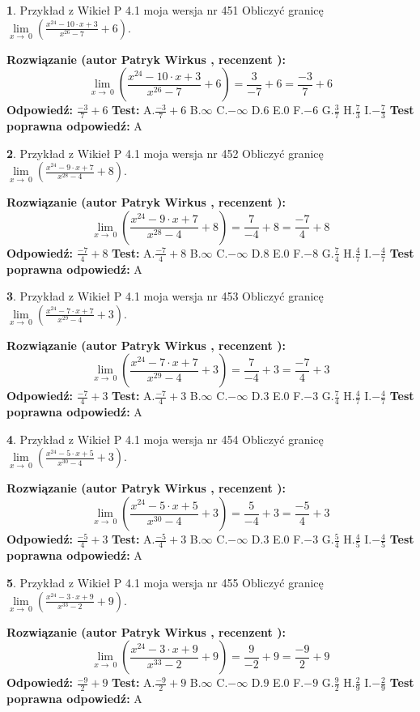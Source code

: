 \documentclass[12pt, a4paper]{article}
\theoremstyle{definition} %
\newtheorem{zad}{}
\newcommand{\zadStart}[1]{\begin{zad}#1\newline}
\newcommand{\zadStop}{\end{zad}}
\newcommand{\rozwStart}[2]{\noindent \textbf{Rozwiązanie (autor #1 , recenzent #2): }\newline}
\newcommand{\rozwStop}{\newline}
\newcommand{\odpStart}{\noindent \textbf{Odpowiedź:}\newline}
\newcommand{\odpStop}{\newline}
\newcommand{\testStart}{\noindent \textbf{Test:}\newline}
\newcommand{\testStop}{\newline}
\newcommand{\kluczStart}{\noindent \textbf{Test poprawna odpowiedź:}\newline}
\newcommand{\kluczStop}{\newline}
\begin{document}
\zadStart{Przykład z Wikieł P 4.1 moja wersja nr 451}
Obliczyć granicę $\lim\limits_{x\to\ 0}(\frac{x^{24}-10 \cdot x +3}{x^{26}-7}+6)$.
\zadStop
\rozwStart{Patryk Wirkus}{}
$$\lim\limits_{x\to\ 0}(\frac{x^{24}-10 \cdot x +3}{x^{26}-7}+6)=\frac{3}{-7}+6=\frac{-3}{7}+6$$
\rozwStop
\odpStart
$\frac{-3}{7}+6$
\odpStop
\testStart
A.$\frac{-3}{7}+6$
B.$\infty$
C.$-\infty$
D.$6$
E.$0$
F.$-6$
G.$\frac{3}{7}$
H.$\frac{7}{3}$
I.$-\frac{7}{3}$
\testStop
\kluczStart
A
\kluczStop



\zadStart{Przykład z Wikieł P 4.1 moja wersja nr 452}
Obliczyć granicę $\lim\limits_{x\to\ 0}(\frac{x^{24}-9 \cdot x +7}{x^{28}-4}+8)$.
\zadStop
\rozwStart{Patryk Wirkus}{}
$$\lim\limits_{x\to\ 0}(\frac{x^{24}-9 \cdot x +7}{x^{28}-4}+8)=\frac{7}{-4}+8=\frac{-7}{4}+8$$
\rozwStop
\odpStart
$\frac{-7}{4}+8$
\odpStop
\testStart
A.$\frac{-7}{4}+8$
B.$\infty$
C.$-\infty$
D.$8$
E.$0$
F.$-8$
G.$\frac{7}{4}$
H.$\frac{4}{7}$
I.$-\frac{4}{7}$
\testStop
\kluczStart
A
\kluczStop



\zadStart{Przykład z Wikieł P 4.1 moja wersja nr 453}
Obliczyć granicę $\lim\limits_{x\to\ 0}(\frac{x^{24}-7 \cdot x +7}{x^{29}-4}+3)$.
\zadStop
\rozwStart{Patryk Wirkus}{}
$$\lim\limits_{x\to\ 0}(\frac{x^{24}-7 \cdot x +7}{x^{29}-4}+3)=\frac{7}{-4}+3=\frac{-7}{4}+3$$
\rozwStop
\odpStart
$\frac{-7}{4}+3$
\odpStop
\testStart
A.$\frac{-7}{4}+3$
B.$\infty$
C.$-\infty$
D.$3$
E.$0$
F.$-3$
G.$\frac{7}{4}$
H.$\frac{4}{7}$
I.$-\frac{4}{7}$
\testStop
\kluczStart
A
\kluczStop



\zadStart{Przykład z Wikieł P 4.1 moja wersja nr 454}
Obliczyć granicę $\lim\limits_{x\to\ 0}(\frac{x^{24}-5 \cdot x +5}{x^{30}-4}+3)$.
\zadStop
\rozwStart{Patryk Wirkus}{}
$$\lim\limits_{x\to\ 0}(\frac{x^{24}-5 \cdot x +5}{x^{30}-4}+3)=\frac{5}{-4}+3=\frac{-5}{4}+3$$
\rozwStop
\odpStart
$\frac{-5}{4}+3$
\odpStop
\testStart
A.$\frac{-5}{4}+3$
B.$\infty$
C.$-\infty$
D.$3$
E.$0$
F.$-3$
G.$\frac{5}{4}$
H.$\frac{4}{5}$
I.$-\frac{4}{5}$
\testStop
\kluczStart
A
\kluczStop



\zadStart{Przykład z Wikieł P 4.1 moja wersja nr 455}
Obliczyć granicę $\lim\limits_{x\to\ 0}(\frac{x^{24}-3 \cdot x +9}{x^{33}-2}+9)$.
\zadStop
\rozwStart{Patryk Wirkus}{}
$$\lim\limits_{x\to\ 0}(\frac{x^{24}-3 \cdot x +9}{x^{33}-2}+9)=\frac{9}{-2}+9=\frac{-9}{2}+9$$
\rozwStop
\odpStart
$\frac{-9}{2}+9$
\odpStop
\testStart
A.$\frac{-9}{2}+9$
B.$\infty$
C.$-\infty$
D.$9$
E.$0$
F.$-9$
G.$\frac{9}{2}$
H.$\frac{2}{9}$
I.$-\frac{2}{9}$
\testStop
\kluczStart
A
\kluczStop
\end{document}
